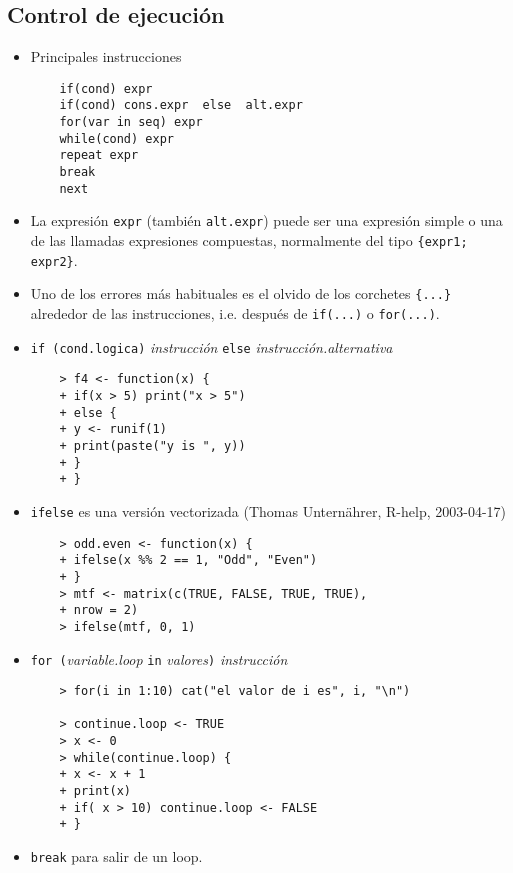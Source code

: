 \subsection{Control de ejecución}
\begin{itemize}
    \item Principales instrucciones
    \begin{verbatim}
    if(cond) expr
    if(cond) cons.expr  else  alt.expr
    for(var in seq) expr
    while(cond) expr
    repeat expr
    break
    next
    \end{verbatim}

    \item La expresión \verb"expr" (también \verb"alt.expr")
    puede ser una expresión simple o una de las llamadas
    expresiones compuestas, normalmente del tipo \verb"{expr1; expr2}".

    \item Uno de los errores más habituales es el olvido de los corchetes
    \verb"{...}" alrededor de las instrucciones, i.e. después de \verb"if(...)"
    o \verb"for(...)".

    \item \verb"if (cond.logica)" \textit{instrucción} \verb"else"
    \textit{instrucción.alternativa}
    \begin{verbatim}
    > f4 <- function(x) {
    + if(x > 5) print("x > 5")
    + else {
    + y <- runif(1)
    + print(paste("y is ", y))
    + }
    + }
    \end{verbatim}

    \item \verb"ifelse" es una versión vectorizada
    (Thomas Unternährer, R-help, 2003-04-17)
    \begin{verbatim}
    > odd.even <- function(x) {
    + ifelse(x %% 2 == 1, "Odd", "Even")
    + }
    > mtf <- matrix(c(TRUE, FALSE, TRUE, TRUE),
    + nrow = 2)
    > ifelse(mtf, 0, 1)
    \end{verbatim}

    \item \verb"for ("\textit{variable.loop} \verb"in" \textit{valores}\verb")"
    \textit{instrucción}
    \begin{verbatim}
    > for(i in 1:10) cat("el valor de i es", i, "\n")

    > continue.loop <- TRUE
    > x <- 0
    > while(continue.loop) {
    + x <- x + 1
    + print(x)
    + if( x > 10) continue.loop <- FALSE
    + }
    \end{verbatim}

    \item \verb"break" para salir de un loop.

\end{itemize}

